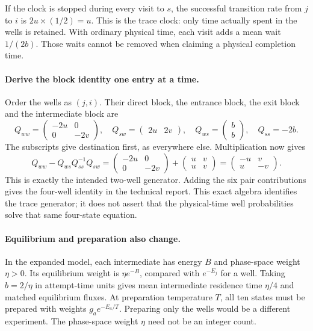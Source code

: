 If the clock is stopped during every visit to $s$, the successful transition
rate from $j$ to $i$ is $2u\times(1/2)=u$. This is the trace clock:
only time actually spent in the wells is retained. With ordinary physical
time, each visit adds a mean wait $1/(2b)$. Those waits cannot be removed
when claiming a physical completion time.

\paragraph{Derive the block identity one entry at a time.}
Order the wells as $(j,i)$. Their direct block, the entrance block, the
exit block and the intermediate block are
\[
 Q_{ww}=\begin{pmatrix}-2u&0\\0&-2v\end{pmatrix},\quad
 Q_{sw}=\begin{pmatrix}2u&2v\end{pmatrix},\quad
 Q_{ws}=\begin{pmatrix}b\\b\end{pmatrix},\quad Q_{ss}=-2b.
\]
The subscripts give destination first, as everywhere else. Multiplication
now gives
\[
 Q_{ww}-Q_{ws}Q_{ss}^{-1}Q_{sw}
 =\begin{pmatrix}-2u&0\\0&-2v\end{pmatrix}
  +\begin{pmatrix}u&v\\u&v\end{pmatrix}
 =\begin{pmatrix}-u&v\\u&-v\end{pmatrix}.
\]
This is exactly the intended two-well generator. Adding the six pair
contributions gives the four-well identity in the technical report.
This exact algebra identifies the trace generator; it does not assert that
the physical-time well probabilities solve that same four-state equation.

\paragraph{Equilibrium and preparation also change.}
In the expanded model, each intermediate has energy $B$ and phase-space
weight $\eta>0$. Its equilibrium weight is $\eta e^{-B}$, compared
with $e^{-E_j}$ for a well. Taking $b=2/\eta$ in attempt-time units
gives mean intermediate residence time $\eta/4$ and matched equilibrium
fluxes. At preparation temperature $T$, all ten states must be prepared
with weights $g_a e^{-E_a/T}$. Preparing only the wells would be a different
experiment. The phase-space weight $\eta$ need not be an integer count.

